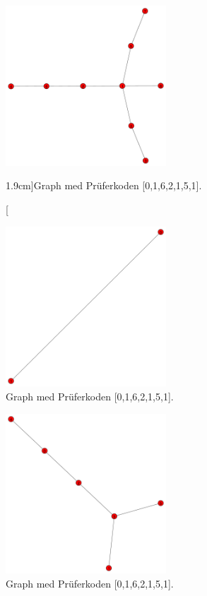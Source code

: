 \documentclass[nobib]{tufte-handout}
\begin{document}
\begin{solution}
\begin{figure}
    \includegraphics[width=6cm, height=6cm]{graphics/F8/graph1.pdf}
        
        \label{fig:python3_prufer_graph1}
        \caption[][1.9cm]{Graph med Prüferkoden [0,1,6,2,1,5,1].}
\end{figure}

\begin{figure}
    \includegraphics[width=6cm, height=6cm]{graphics/F8/graph2.pdf}
        
        \label{fig:python3_prufer_graph2}
        \caption{Graph med Prüferkoden [0,1,6,2,1,5,1].}
\end{figure}
\begin{figure}
    \includegraphics[width=6cm, height=6cm]{graphics/F8/graph3.pdf}
        
        \label{fig:python3_prufer_graph3}
        \caption{Graph med Prüferkoden [0,1,6,2,1,5,1].}
\end{figure}


\end{solution}
\end{document}
